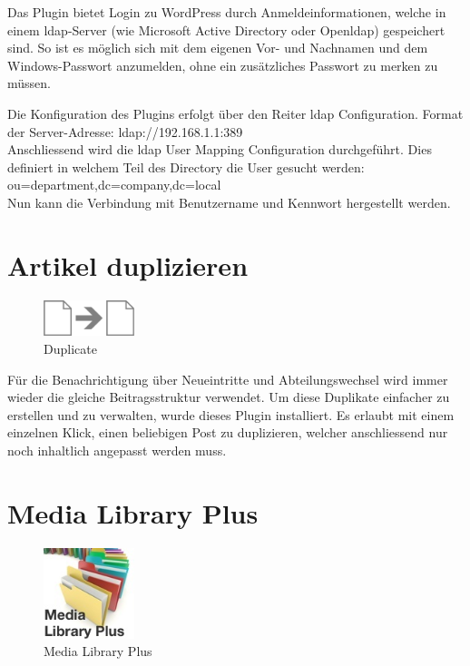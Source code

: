 \documentclass[a4paper,11pt,twoside,titlepage,openright]{report}
\numberwithin{equation}{section}		%
\numberwithin{figure}{section}			%
\numberwithin{table}{section}				%
\begin{document}
Das Plugin bietet Login zu WordPress durch Anmeldeinformationen, welche in einem \acrshort{ldap}-Server (wie Microsoft Active Directory oder Open\acrshort{ldap}) gespeichert sind. So ist es möglich sich mit dem eigenen Vor- und Nachnamen und dem Windows-Passwort anzumelden, ohne ein zusätzliches Passwort zu merken zu müssen.\par
\newpage
Die Konfiguration des Plugins erfolgt über den Reiter \acrshort{ldap} Configuration. Format der Server-Adresse: ldap://192.168.1.1:389\\
Anschliessend wird die \acrshort{ldap} User Mapping Configuration durchgeführt. Dies definiert in welchem Teil des Directory die User gesucht werden:\\ ou=department,dc=company,dc=local\\
Nun kann die Verbindung mit Benutzername und Kennwort hergestellt werden.

\section{Artikel duplizieren}

\begin{figure}
\vspace{-20px}
\centering
\includegraphics[width=100px]{Images/duplicate.png}
\caption{Duplicate}
\end{figure}

Für die Benachrichtigung über Neueintritte und Abteilungswechsel wird immer wieder die gleiche Beitragsstruktur verwendet. Um diese Duplikate einfacher zu erstellen und zu verwalten, wurde dieses Plugin installiert. Es erlaubt mit einem einzelnen Klick, einen beliebigen Post zu duplizieren, welcher anschliessend nur noch inhaltlich angepasst werden muss.


\section{Media Library Plus}

\begin{figure}
\vspace{-20px}
\centering
\includegraphics[width=100px]{Images/Media_Library_Plus.jpg}
\caption{Media Library Plus}
\vspace{-10px}
\end{figure}
\end{document}
